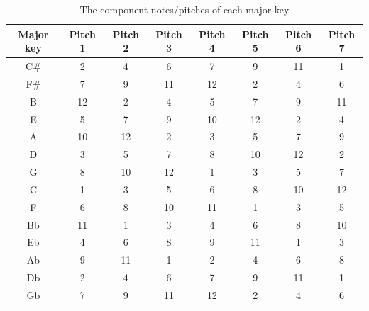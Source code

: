    \begin{table}
        \caption{The component notes/pitches of each major key}
        \label{tab:bigtable}
        \centering
        \begin{tabular}{|c||c|c|c|c|c|c|c|}
        \hline
        Major key & Pitch 1 & Pitch 2 & Pitch 3 & Pitch 4 & Pitch 5 & Pitch 6 & Pitch 7 \\
        \hline
        \hline
        C\# & 2 & 4 & 6 & 7 & 9 & 11 & 1 \\
        \hline
        F\# & 7 & 9 & 11 & 12 & 2 & 4 & 6\\
        \hline
        B & 12 & 2 & 4 & 5 & 7 & 9 & 11\\
        \hline
        E & 5 & 7 & 9 & 10 & 12 & 2 & 4\\
        \hline
        A & 10 & 12 & 2 & 3 & 5 & 7 & 9\\
        \hline
        D & 3 & 5 & 7 & 8 & 10 & 12 & 2\\
        \hline
        G & 8 & 10 & 12 & 1 & 3 & 5 & 7\\
        \hline
        C & 1 & 3 & 5 & 6 & 8 & 10 & 12\\
        \hline
        F & 6 & 8 & 10 & 11 & 1 & 3 & 5\\
        \hline
        Bb & 11 & 1 & 3 & 4 & 6 & 8 & 10\\
        \hline
        Eb & 4 & 6 & 8 & 9 & 11 & 1 & 3\\
        \hline
        Ab & 9 & 11 & 1 & 2 & 4 & 6 & 8\\
        \hline
        Db & 2 & 4 & 6 & 7 & 9 & 11 & 1\\
        \hline
        Gb & 7 & 9 & 11 & 12 & 2 & 4 & 6\\
        \hline
        \end{tabular}
        \end{table}

